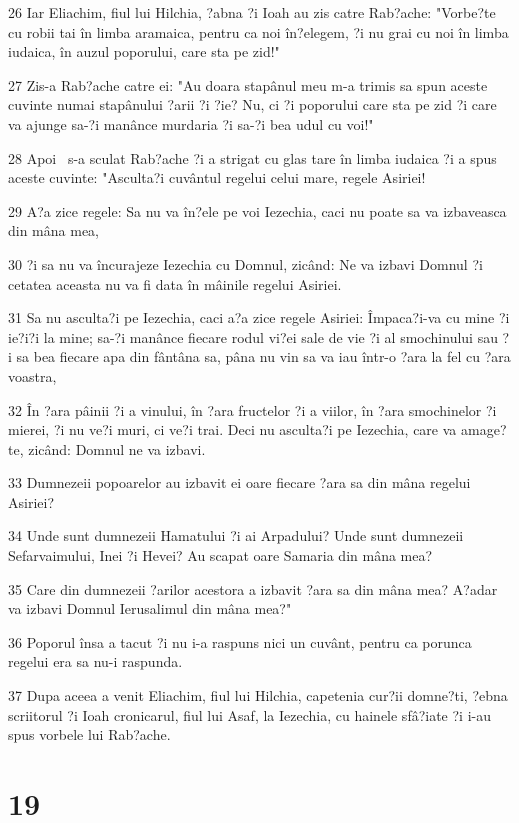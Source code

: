 \par 26 Iar Eliachim, fiul lui Hilchia, ?abna ?i Ioah au zis catre Rab?ache: "Vorbe?te cu robii tai în limba aramaica, pentru ca noi în?elegem, ?i nu grai cu noi în limba iudaica, în auzul poporului, care sta pe zid!"
\par 27 Zis-a Rab?ache catre ei: "Au doara stapânul meu m-a trimis sa spun aceste cuvinte numai stapânului ?arii ?i ?ie? Nu, ci ?i poporului care sta pe zid ?i care va ajunge sa-?i manânce murdaria ?i sa-?i bea udul cu voi!"
\par 28 Apoi  s-a sculat Rab?ache ?i a strigat cu glas tare în limba iudaica ?i a spus aceste cuvinte: "Asculta?i cuvântul regelui celui mare, regele Asiriei!
\par 29 A?a zice regele: Sa nu va în?ele pe voi Iezechia, caci nu poate sa va izbaveasca din mâna mea,
\par 30 ?i sa nu va încurajeze Iezechia cu Domnul, zicând: Ne va izbavi Domnul ?i cetatea aceasta nu va fi data în mâinile regelui Asiriei.
\par 31 Sa nu asculta?i pe Iezechia, caci a?a zice regele Asiriei: Împaca?i-va cu mine ?i ie?i?i la mine; sa-?i manânce fiecare rodul vi?ei sale de vie ?i al smochinului sau ?i sa bea fiecare apa din fântâna sa, pâna nu vin sa va iau într-o ?ara la fel cu ?ara voastra,
\par 32 În ?ara pâinii ?i a vinului, în ?ara fructelor ?i a viilor, în ?ara smochinelor ?i mierei, ?i nu ve?i muri, ci ve?i trai. Deci nu asculta?i pe Iezechia, care va amage?te, zicând: Domnul ne va izbavi.
\par 33 Dumnezeii popoarelor au izbavit ei oare fiecare ?ara sa din mâna regelui Asiriei?
\par 34 Unde sunt dumnezeii Hamatului ?i ai Arpadului? Unde sunt dumnezeii Sefarvaimului, Inei ?i Hevei? Au scapat oare Samaria din mâna mea?
\par 35 Care din dumnezeii ?arilor acestora a izbavit ?ara sa din mâna mea? A?adar va izbavi Domnul Ierusalimul din mâna mea?"
\par 36 Poporul însa a tacut ?i nu i-a raspuns nici un cuvânt, pentru ca porunca regelui era sa nu-i raspunda.
\par 37 Dupa aceea a venit Eliachim, fiul lui Hilchia, capetenia cur?ii domne?ti, ?ebna scriitorul ?i Ioah cronicarul, fiul lui Asaf, la Iezechia, cu hainele sfâ?iate ?i i-au spus vorbele lui Rab?ache.

\chapter{19}

